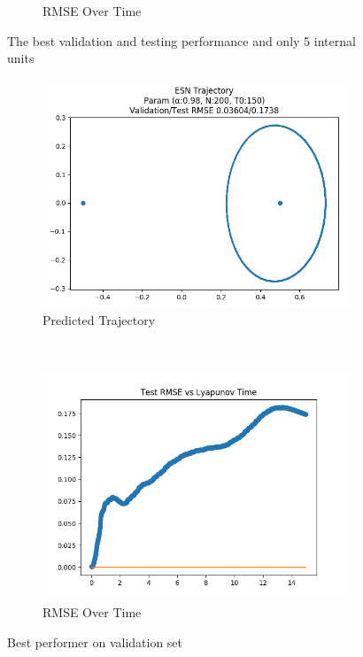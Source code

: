 \documentclass{article}
\begin{document}
\begin{figure}[H]
\begin{subfigure}[b]{0.45\textwidth}
        \caption{RMSE Over Time}
    \end{subfigure}
    \caption{The best validation and testing performance and only 5 internal units}
    \label{fig:3brounded}
\end{figure}

\begin{figure}[H]
    \centering
    \begin{subfigure}[b]{0.45\textwidth}
        \includegraphics[width=\textwidth]{doc/paper/images/r3body/rank_0_param_566_fit.png}
        \caption{Predicted Trajectory}
    \end{subfigure}
    ~
    \begin{subfigure}[b]{0.45\textwidth}
        \includegraphics[width=\textwidth]{doc/paper/images/r3body/rank_0_param_566_rmse.png}
        \caption{RMSE Over Time}
    \end{subfigure}
    \caption{Best performer on validation set}
\end{figure}
\end{document}
